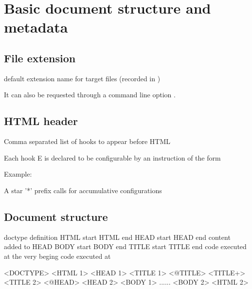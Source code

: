 \section{Basic document structure and metadata}
\label{sec:document_structure}

\subsection{File extension}

 {default extension name for target files  (recorded in )}\EndDoc

It can also be requested through a command line option .

\subsection{HTML header}
 {Comma separated list of hooks to appear before HTML}\EndDoc

Each hook E is declared to be configurable by an instruction of the form 


Example:

\begin{texsource}
\end{texsource}

A star '*' prefix calls for accumulative configurations

\subsection{Document structure}


 {doctype definition}\EndDoc
{} {HTML start} {HTML end}\EndDoc
{} {HEAD start} {HEAD end}\EndDoc
{} {content added to HEAD}\EndDoc
{} {BODY start} {BODY end}\EndDoc
{} {TITLE start} {TITLE end}\EndDoc
{} {code executed at the very beging} {code executed at }\EndDoc

\begin{texsource}
<DOCTYPE>
<HTML 1>
  <HEAD 1>
     <TITLE 1>
        <@TITLE>
        <TITLE+>
     <TITLE 2>
     <@HEAD>
  <HEAD 2>
  <BODY 1>
  ......
  <BODY 2>
<HTML 2>
\end{texsource}

